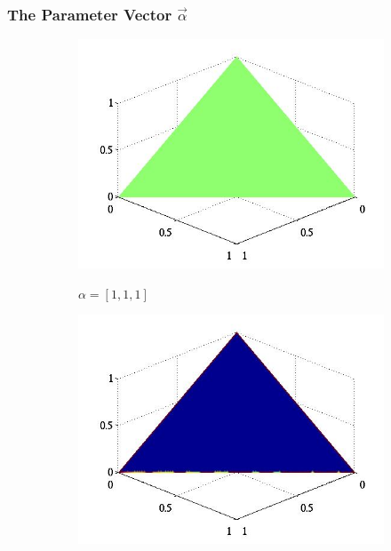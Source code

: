 \documentclass[12pt]{beamer}
\begin{document}
\begin{frame}
    \frametitle{The Parameter Vector $\vec{\alpha}$}

    \begin{figure}[!h]
        \centering
        \begin{subfigure}[t]{0.35\textwidth}
            \centering
            \includegraphics[width=\textwidth]{images/dirichlet_distribution_uniform_one.png}

            $\alpha = [1, 1, 1]$
        \end{subfigure}
        \begin{subfigure}[t]{0.35\textwidth}
            \centering
            \includegraphics[width=\textwidth]{images/dirichlet_distribution_uniform_fractional.png}


\end{subfigure}
\end{figure}
\end{frame}
\end{document}

